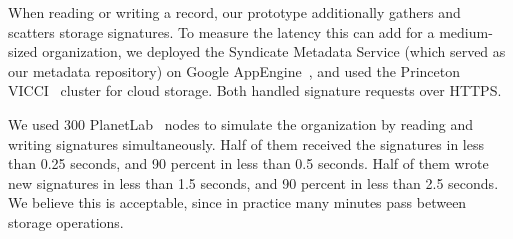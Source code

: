 When reading or writing a record, our prototype additionally gathers and scatters storage signatures.  To measure the latency this can add for a medium-sized organization, we deployed the Syndicate Metadata Service (which served as our metadata repository) on Google AppEngine~\cite{google-appengine}, and used the Princeton VICCI~\cite{VICCI} cluster for cloud storage.  Both handled signature requests over HTTPS.

We used 300 PlanetLab~\cite{PlanetLab} nodes to simulate the organization by reading and writing signatures simultaneously.  Half of them received the signatures in less than 0.25 seconds, and 90 percent in less than 0.5 seconds.  Half of them wrote new signatures in less than 1.5 seconds, and 90 percent in less than 2.5 seconds.  We believe this is acceptable, since in practice many minutes pass between storage operations.